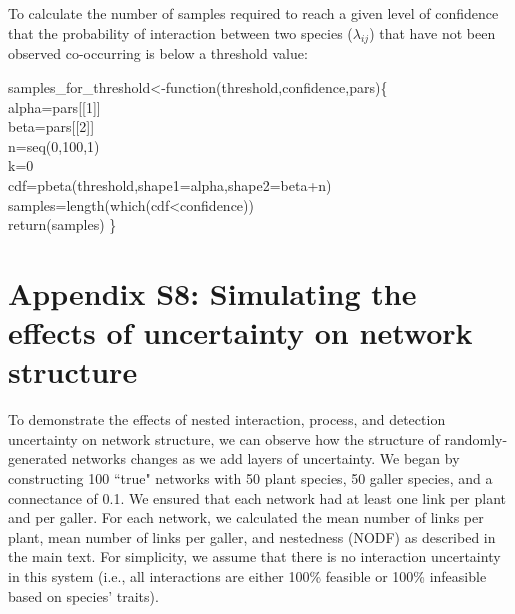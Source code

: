 \documentclass[12pt]{article}
\begin{document}
  To calculate the number of samples required to reach a given level of confidence that the probability of interaction between two species ($\lambda_{ij}$) that have not been observed co-occurring is below a threshold value:


  \vspace{12pt}
  \begin{em}
  \noindent \hspace{2pt}samples\_for\_threshold\textless-function(threshold,confidence,pars)\{\\
    \vspace{4pt}
    alpha=pars[[1]]\\
    beta=pars[[2]]\\
    n=seq(0,100,1)\\
    k=0\\ 
    cdf=pbeta(threshold,shape1=alpha,shape2=beta+n)\\
    samples=length(which(cdf\textless confidence))\\
    return(samples) \}
  \end{em}

\clearpage

\section*{Appendix S8: Simulating the effects of uncertainty on network structure}

  To demonstrate the effects of nested interaction, process, and detection uncertainty on network structure, we can observe how the structure of randomly-generated networks changes as we add layers of uncertainty. We began by constructing 100 ``true" networks with 50 plant species, 50 galler species, and a connectance of 0.1. We ensured that each network had at least one link per plant and per galler. For each network, we calculated the mean number of links per plant, mean number of links per galler, and nestedness (NODF) as described in the main text. For simplicity, we assume that there is no interaction uncertainty in this system (i.e., all interactions are either 100\% feasible or 100\% infeasible based on species' traits).
\end{document}
